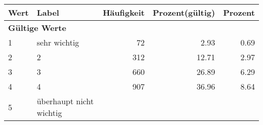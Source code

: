      \begin{longtable}{lXrrr}
     \toprule
     \textbf{Wert} & \textbf{Label} & \textbf{Häufigkeit} & \textbf{Prozent(gültig)} & \textbf{Prozent} \\
     \endhead
     \midrule
     \multicolumn{5}{l}{\textbf{Gültige Werte}}\\

     1 &
     \multicolumn{1}{X}{ sehr wichtig   } &


       \num{72} &
       \num[round-mode=places,round-precision=2]{2.93} &
         \num[round-mode=places,round-precision=2]{0.69} \\

     2 &
     \multicolumn{1}{X}{ 2   } &


       \num{312} &
       \num[round-mode=places,round-precision=2]{12.71} &
         \num[round-mode=places,round-precision=2]{2.97} \\

     3 &
     \multicolumn{1}{X}{ 3   } &


       \num{660} &
       \num[round-mode=places,round-precision=2]{26.89} &
         \num[round-mode=places,round-precision=2]{6.29} \\

     4 &
     \multicolumn{1}{X}{ 4   } &


       \num{907} &
       \num[round-mode=places,round-precision=2]{36.96} &
         \num[round-mode=places,round-precision=2]{8.64} \\

     5 &
     \multicolumn{1}{X}{ überhaupt nicht wichtig   } &



\end{longtable}
